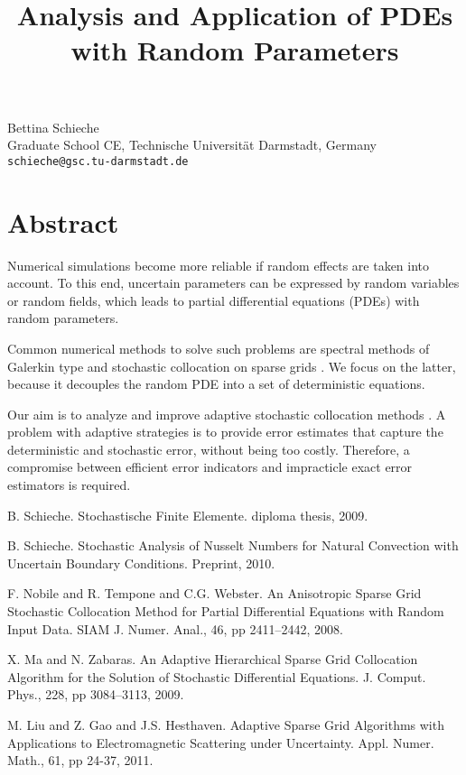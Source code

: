 \title{Analysis and Application of PDEs with Random Parameters}
 \author{} \institute{}
\maketitle
\begin{center}
{\large Bettina Schieche}\\
Graduate School CE, Technische Universit\"at Darmstadt, Germany\\
{\tt schieche@gsc.tu-darmstadt.de}

\end{center}

\section*{Abstract}

Numerical simulations become more reliable if random effects are taken into account. To this end, uncertain parameters can be expressed by random variables or random fields, which leads to partial differential equations (PDEs) with random parameters.

Common numerical methods to solve such problems are spectral methods of Galerkin type \cite{Schieche1} and stochastic collocation on sparse grids \cite{Schieche11}. We focus on the latter, because it decouples the random PDE into a set of deterministic equations.

Our aim is to analyze and improve adaptive stochastic collocation methods \cite{Nobile1,Ma1,Liu1}. A problem with adaptive strategies is to provide error estimates that capture the deterministic and stochastic error, without being too costly. Therefore, a compromise between efficient error indicators and impracticle exact error estimators is required.


\begin{thebibliography}{10}

{\sc B. Schieche}. {Stochastische Finite Elemente}. diploma thesis, 2009.



{\sc B. Schieche}. {Stochastic Analysis of Nusselt Numbers for Natural Convection with Uncertain Boundary Conditions}. Preprint, 2010.



{\sc F. Nobile and R. Tempone and C.G. Webster}. {An Anisotropic Sparse Grid Stochastic Collocation Method for Partial Differential Equations with Random Input Data}. SIAM J. Numer. Anal., 46, pp 2411--2442, 2008.



{\sc X. Ma and N. Zabaras}. {An Adaptive Hierarchical Sparse Grid Collocation Algorithm for the Solution of Stochastic Differential Equations}. J. Comput. Phys., 228, pp 3084--3113, 2009.



{\sc M. Liu and Z. Gao and J.S. Hesthaven}. {Adaptive Sparse Grid Algorithms with Applications to Electromagnetic Scattering under Uncertainty}. Appl. Numer. Math., 61, pp 24-37, 2011.

\end{thebibliography}
